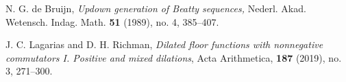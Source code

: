 \documentclass[11pt, letterpaper, reqno]{amsart}
\theoremstyle{definition}
\theoremstyle{remark}
\numberwithin{equation}{section}
\begin{document}
\begin{thebibliography}{99}
N. G. de Bruijn,
 \emph{Updown generation of Beatty sequences,}
 Nederl. Akad. Wetensch. Indag. Math. {\bf 51} (1989), no. 4, 385--407.

 
 
 
 
 





 
 J. C. Lagarias and D. H. Richman,
 \emph{Dilated floor functions with nonnegative commutators I. Positive and mixed dilations},
 Acta Arithmetica, {\bf 187} (2019), no. 3, 271--300.
 

\end{thebibliography}
\end{document}
